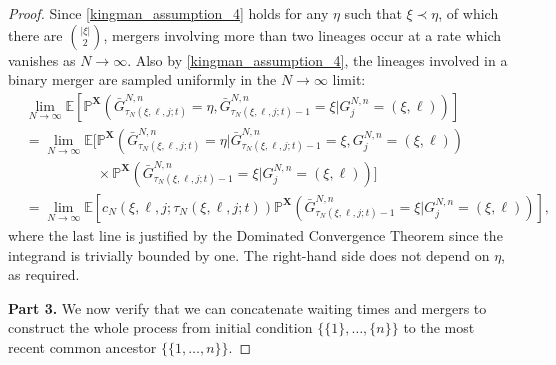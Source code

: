 \documentclass[a4paper,11pt]{article}
\theoremstyle{definition}
\newcommand{\bbP}{\mathbb{P}}
\newcommand{\bbE}{\mathbb{E}}
\newcommand{\bfX}{\mathbf{X}}
\begin{document}
\begin{proof}
Since \eqref{kingman_assumption_4} holds for any $\eta$ such that $\xi \prec \eta$, of which there are $\binom{ | \xi | }{ 2 }$, mergers involving more than two lineages occur at a rate which vanishes as $N \to \infty$.
Also by \eqref{kingman_assumption_4}, the lineages involved in a binary merger are sampled uniformly in the $N \to \infty$ limit:
\begin{align*}
&\lim_{ N \to \infty } \bbE[ \bbP^{ \bfX }( \bar{ G }_{ \tau_N( \xi, \ell, j; t ) }^{ N, n } = \eta, \bar{ G }_{ \tau_N( \xi, \ell, j; t ) - 1 }^{ N, n } = \xi | G_j^{ N, n } = ( \xi, \ell ) ) ]  \\
&= \lim_{ N \to \infty } \bbE[ \bbP^{ \bfX }( \bar{ G }_{ \tau_N( \xi, \ell, j; t ) }^{ N, n } = \eta | \bar{ G }_{ \tau_N( \xi, \ell, j; t ) - 1 }^{ N, n } = \xi, G_j^{ N, n } = ( \xi, \ell ) )  \\
&\phantom{= \lim_{ N \to \infty } \bbE[} \times \bbP^{ \bfX }( \bar{ G }_{ \tau_N( \xi, \ell, j; t ) - 1 }^{ N, n } = \xi | G_j^{ N, n } = ( \xi, \ell ) ) ] \\
&= \lim_{ N \to \infty } \bbE[ c_N( \xi, \ell, j; \tau_N( \xi, \ell, j; t ) ) \bbP^{ \bfX }( \bar{ G }_{ \tau_N( \xi, \ell, j; t ) - 1 }^{ N, n } = \xi | G_j^{ N, n } = ( \xi, \ell ) ) ],
\end{align*}
where the last line is justified by the Dominated Convergence Theorem since the integrand is trivially bounded by one.
The right-hand side does not depend on $\eta$, as required.

\textbf{Part 3.} We now verify that we can concatenate waiting times and mergers to construct the whole process from initial condition $\{ \{ 1 \}, \ldots, \{ n \} \}$ to the most recent common ancestor $\{ \{ 1, \ldots, n \} \}$.


\end{proof}
\end{document}
